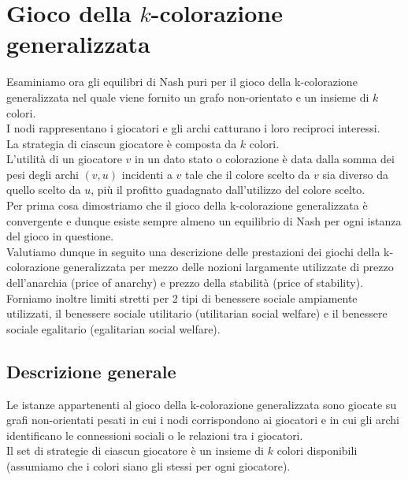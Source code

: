 \chapter{Gioco della \(k\)-colorazione generalizzata}
\justify
Esaminiamo ora gli equilibri di Nash puri per il gioco della k-colorazione generalizzata nel quale viene fornito un grafo non-orientato e un insieme di \(k\) colori.\\

I nodi rappresentano i giocatori e gli archi catturano i loro reciproci interessi.\\

La strategia di ciascun giocatore è composta da \(k\) colori.\\

L'utilità di un giocatore \(v\) in un dato stato o colorazione è data dalla somma dei pesi degli archi \((v, u)\) incidenti a \(v\) tale che il colore scelto da \(v\) sia diverso da quello scelto da \(u\), più il profitto guadagnato dall'utilizzo del colore scelto.\\

Per prima cosa dimostriamo che il gioco della k-colorazione generalizzata è convergente e dunque esiste sempre almeno un equilibrio di Nash per ogni istanza del gioco in questione.\\

Valutiamo dunque in seguito una descrizione delle prestazioni dei giochi della k-colorazione generalizzata per mezzo delle nozioni largamente utilizzate di prezzo dell'anarchia (price of anarchy) e prezzo della stabilità (price of stability).\\

Forniamo inoltre limiti stretti per 2 tipi di benessere sociale ampiamente utilizzati, il benessere sociale utilitario (utilitarian social welfare) e il benessere sociale egalitario (egalitarian social welfare).\\

\section{Descrizione generale}
\justify
Le istanze appartenenti al gioco della k-colorazione generalizzata sono giocate su grafi non-orientati pesati in cui i nodi corrispondono ai giocatori e in cui gli archi identificano le connessioni sociali o le relazioni tra i giocatori.\\

Il set di strategie di ciascun giocatore è un insieme di \(k\) colori disponibili (assumiamo che i colori siano gli stessi per ogni giocatore).\\

